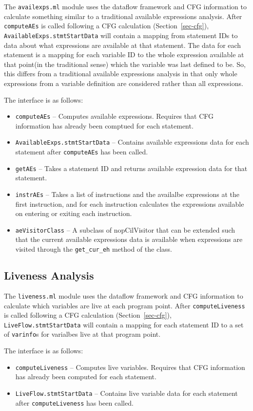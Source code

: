 \documentclass[letterpaper]{article}
\def\secref#1{Section~\ref{sec-#1}}
\def\t#1{{\tt #1}}
\begin{document}
The \t{availexps.ml} module uses the dataflow framework and CFG
information to calculate something similar to a traditional available
expressions analysis. After \t{computeAEs} is called following a CFG
calculation (\secref{cfg}), \t{AvailableExps.stmtStartData} will
contain a mapping
from statement IDs to data about what expressions are available at
that statement. The data for each statement is a mapping for each
variable ID to the whole expression available at that point(in the
traditional sense) which the variable was last defined to be. So,
this differs from a traditional available expressions analysis in that
only whole expressions from a variable definition are considered rather
than all expressions.

The interface is as follows:
\begin{itemize}
\item \t{computeAEs} -- Computes available expressions. Requires
that CFG information has already been comptued for each statement.
\item \t{AvailableExps.stmtStartData} -- Contains available
expressions data for each statement after \t{computeAEs} has been
called.
\item \t{getAEs} -- Takes a statement ID and returns
available expression data for that statement.
\item \t{instrAEs} -- Takes a list of instructions and
the availalbe expressions at the first instruction, and
for each instruction calculates the expressions available
on entering or exiting each instruction.
\item \t{aeVisitorClass} -- A subclass of nopCilVisitor that
can be extended such that the current available expressions
data is available when expressions are visited through the
\t{get\_cur\_eh} method of the class.
\end{itemize}

\subsection{Liveness Analysis}

The \t{liveness.ml} module uses the dataflow framework and
CFG information to calculate which variables are live at
each program point. After \t{computeLiveness} is called
following a CFG calculation (\secref{cfg}), \t{LiveFlow.stmtStartData} will
contain a mapping for each statement ID to a set of \t{varinfo}s
for varialbes live at that program point.

The interface is as follows:
\begin{itemize}
\item \t{computeLiveness} -- Computes live variables. Requires
that CFG information has already been computed for each statement.
\item \t{LiveFlow.stmtStartData} -- Contains live variable data
for each statement after \t{computeLiveness} has been called.
\end{itemize}
\end{document}
